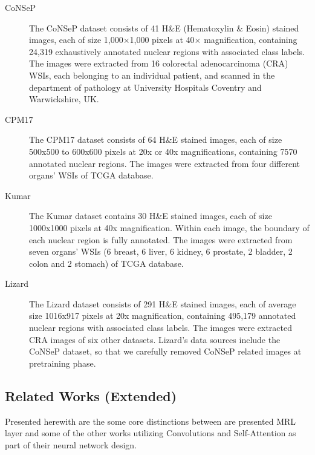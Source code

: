 \documentclass{article}
\begin{document}
\begin{description}
    \item[CoNSeP] The CoNSeP dataset consists of 41 H\&E (Hematoxylin \& Eosin) stained images, each of size 1,000×1,000 pixels at 40× magnification, containing 24,319 exhaustively annotated nuclear regions with associated class labels.
    The images were extracted from 16 colorectal adenocarcinoma (CRA) WSIs, each belonging to an individual patient, and scanned in the department of pathology at University Hospitals Coventry and Warwickshire, UK.
\item[CPM17] The CPM17 dataset consists of 64 H\&E stained images, each of size 500x500 to 600x600 pixels at 20x or 40x magnifications, containing 7570 annotated nuclear regions. The images were extracted from four different organs' WSIs of TCGA database.
    \item[Kumar] The Kumar dataset contains 30  H\&E stained images, each of size 1000x1000 pixels at 40x magnification. Within each image, the boundary of each nuclear region is fully annotated. The images were extracted from seven organs' WSIs (6 breast, 6 liver, 6 kidney, 6 prostate, 2 bladder, 2 colon and 2 stomach) of TCGA database. 
    \item[Lizard] The Lizard dataset consists of 291 H\&E stained images, each of average size 1016x917 pixels at 20x magnification, containing 495,179 annotated nuclear regions with associated class labels. The images were extracted CRA images of six other datasets. Lizard's data sources include the CoNSeP dataset, so that we carefully removed CoNSeP related images at pretraining phase.
\end{description}

\subsection{Related Works (Extended)}\label{Appen:Related_work}

Presented herewith are the some core distinctions between are presented MRL layer and some of the other works utilizing Convolutions and Self-Attention as part of their neural network design.
\end{document}
